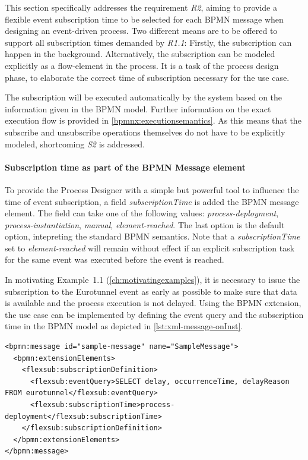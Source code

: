 This section specifically addresses the requirement \textit{R2}, aiming to provide a flexible event subscription time to be selected for each BPMN message when designing an event-driven process.
Two different means are to be offered to support all subscription times demanded by \textit{R1.1}: Firstly, the subscription can happen in the background. Alternatively, the subscription can be modeled explicitly as a flow-element in the process.
It is a task of the process design phase, to elaborate the correct time of subscription necessary for the use case.

The subscription will be executed automatically by the system based on the information given in the BPMN model. Further information on the exact execution flow is provided in \autoref{bpmnx:executionsemantics}.
As this means that the subscribe and unsubscribe operations themselves do not have to be explicitly modeled, shortcoming \textit{S2} is addressed.



\paragraph{Subscription time as part of the BPMN Message element\newline}
To provide the Process Designer with a simple but powerful tool to influence the time of event subscription, a field \textit{subscriptionTime} is added the BPMN message element. 
The field can take one of the following values: \textit{process-deployment}, \textit{process-instantiation}, \textit{manual}, \textit{element-reached}. The last option is the default option, intepreting the standard BPMN semantics.
Note that a \textit{subscriptionTime} set to \textit{element-reached} will remain without effect if an explicit subscription task for the same event was executed before the event is reached.

In motivating Example~1.1 (\autoref{ch:motivatingexamples}), it is necessary to issue the subscription to the Eurotunnel event as early as possible to make sure that data is available and the process execution is not delayed.
Using the BPMN extension, the use case can be implemented by defining the event query and the subscription time in the BPMN model as depicted in \autoref{lst:xml-message-onInst}.

\begin{lstlisting}[caption={XML representation of an extended BPMN Message element},label=lst:xml-message-onInst]
<bpmn:message id="sample-message" name="SampleMessage">
  <bpmn:extensionElements>
    <flexsub:subscriptionDefinition>
      <flexsub:eventQuery>SELECT delay, occurrenceTime, delayReason FROM eurotunnel</flexsub:eventQuery>
      <flexsub:subscriptionTime>process-deployment</flexsub:subscriptionTime>
    </flexsub:subscriptionDefinition>
  </bpmn:extensionElements>
</bpmn:message>
\end{lstlisting}


